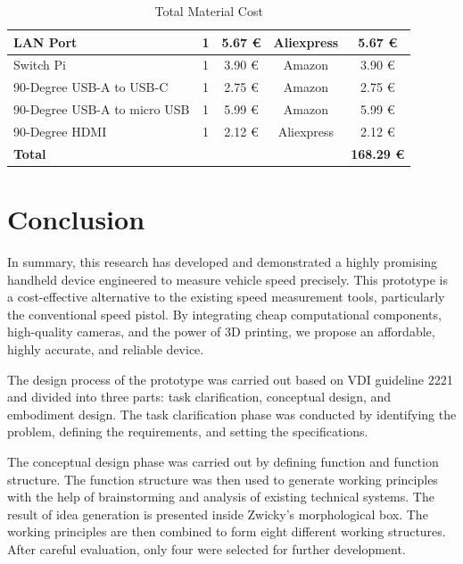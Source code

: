 \begin{table}[H]
\begin{tabular}{|l|c|c|c|c|}
        LAN Port                     & 1               & 5.67 €         & Aliexpress       & 5.67 €               \\ \hline
        Switch Pi                    & 1               & 3.90 €         & Amazon           & 3.90 €               \\ \hline
        90-Degree USB-A to USB-C     & 1               & 2.75 €         & Amazon           & 2.75 €               \\ \hline
        90-Degree USB-A to micro USB & 1               & 5.99 €         & Amazon           & 5.99 €               \\ \hline
        90-Degree HDMI               & 1               & 2.12 €         & Aliexpress       & 2.12 €               \\ \hline
        \textbf{Total}               & ~               & ~              & ~                & \textbf{168.29 €}    \\ \hline
    \end{tabular}
    \caption{Total Material Cost}
    \label{tab:totalmaterialcost}
\end{table}


\chapter{Conclusion}
In summary, this research has developed and demonstrated a highly promising handheld device engineered to measure vehicle speed precisely. This prototype is a cost-effective alternative to the existing speed measurement tools, particularly the conventional speed pistol. By integrating cheap computational components, high-quality cameras, and the power of 3D printing, we propose an affordable, highly accurate, and reliable device.

The design process of the prototype was carried out based on VDI guideline 2221 and divided into three parts: task clarification, conceptual design, and embodiment design. The task clarification phase was conducted by identifying the problem, defining the requirements, and setting the specifications.

The conceptual design phase was carried out by defining function and function structure. The function structure was then used to generate working principles with the help of brainstorming and analysis of existing technical systems. The result of idea generation is presented inside Zwicky's morphological box. The working principles are then combined to form eight different working structures. After careful evaluation, only four were selected for further development.

